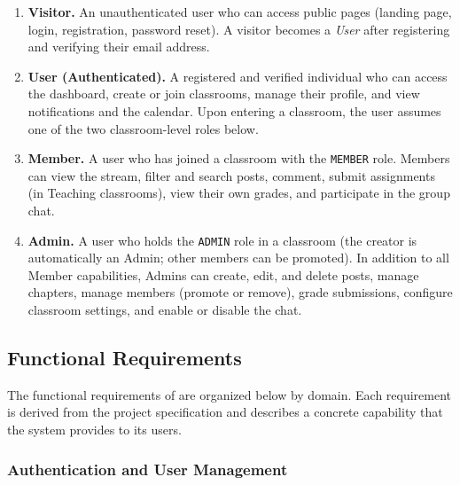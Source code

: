 \begin{enumerate}[label=\textbf{A\arabic*.}]
  \item \textbf{Visitor.}
        An unauthenticated user who can access public pages (landing page, login, registration, password reset).
        A visitor becomes a \emph{User} after registering and verifying their email address.

  \item \textbf{User (Authenticated).}
        A registered and verified individual who can access the dashboard, create or join classrooms, manage their profile, and view notifications and the calendar.
        Upon entering a classroom, the user assumes one of the two classroom-level roles below.

  \item \textbf{Member.}
        A user who has joined a classroom with the \texttt{MEMBER} role.
        Members can view the stream, filter and search posts, comment, submit assignments (in Teaching classrooms), view their own grades, and participate in the group chat.

  \item \textbf{Admin.}
        A user who holds the \texttt{ADMIN} role in a classroom (the creator is automatically an Admin; other members can be promoted).
        In addition to all Member capabilities, Admins can create, edit, and delete posts, manage chapters, manage members (promote or remove), grade submissions, configure classroom settings, and enable or disable the chat.
\end{enumerate}

\subsection{Functional Requirements}
\label{sec:functional-requirements}

The functional requirements of \eduspace{} are organized below by domain.
Each requirement is derived from the project specification and describes a concrete capability that the system provides to its users.

\subsubsection{Authentication and User Management}


